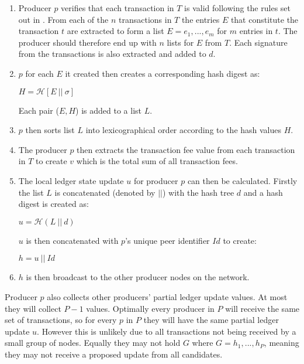 \begin{enumerate}
\item Producer $p$ verifies that each transaction in $T$ is valid following the rules set out in \cite{transactionvalidator}. From each of the $n$ transactions in $T$ the entries $E$ that constitute the transaction $t$ are extracted to form a list $E = e_1,...,e_m$ for $m$ entries in $t$. The producer should therefore end up with $n$ lists for $E$ from $T$. Each signature from the transactions is also extracted and added to $d$.

\item $p$ for each $E$ it created then creates a corresponding hash digest as:
\begin{center}
$H = \mathcal{H}[E~||~\sigma]$
\end{center}

Each pair ($E,H$) is added to a list $L$.

\item $p$ then sorts list $L$ into lexicographical order according to the hash values $H$.

\item The producer $p$ then extracts the transaction fee value from each transaction in $T$ to create $v$ which is the total sum of all transaction fees.

\item The local ledger state update $u$ for producer $p$ can then be calculated. Firstly the list $L$ is concatenated (denoted by $||$) with the hash tree $d$ and a hash digest is created as:

\begin{center}
$u = \mathcal{H}(L~||~d)$
\end{center}

$u$ is then concatenated with $p$'s unique peer identifier $Id$ to create:

\begin{center}
$h = u ~||~Id$
\end{center}

\item $h$ is then broadcast to the other producer nodes on the network.
\end{enumerate}


Producer $p$ also collects other producers' partial ledger update values. At most they will collect $P-1$ values. Optimally every producer in $P$ will receive the same set of transactions, so for every $p$ in $P$ they will have the same partial ledger update $u$. However this is unlikely due to all transactions not being received by a small group of nodes. Equally they may not hold $G$ where $G = h_1,...,h_P$, meaning they may not receive a proposed update from all candidates.